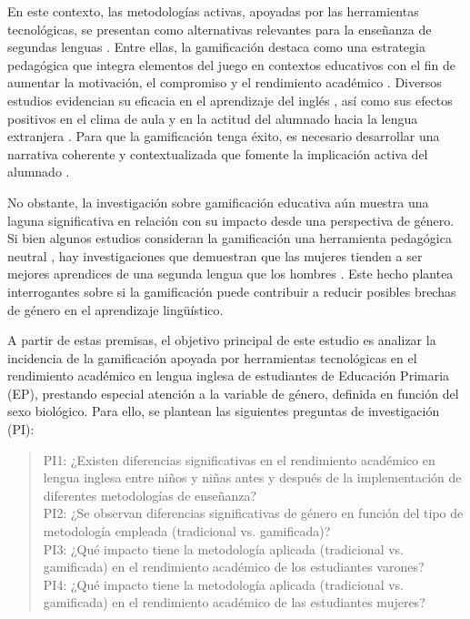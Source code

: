 \documentclass[spanish]{textolivre}
\begin{document}
En este contexto, las metodologías activas, apoyadas por las herramientas tecnológicas, se presentan como alternativas relevantes para la enseñanza de segundas lenguas \cite{silva2017, alvarez2021}. Entre ellas, la gamificación destaca como una estrategia pedagógica que integra elementos del juego en contextos educativos con el fin de aumentar la motivación, el compromiso y el rendimiento académico \cite{zambrano2020}. Diversos estudios evidencian su eficacia en el aprendizaje del inglés \cite{li2022, lampropoulos2022}, así como sus efectos positivos en el clima de aula y en la actitud del alumnado hacia la lengua extranjera \cite{sanchez2019, mora2020}. Para que la gamificación tenga éxito, es necesario desarrollar una narrativa coherente y contextualizada que fomente la implicación activa del alumnado \cite{quintero2018}.

No obstante, la investigación sobre gamificación educativa aún muestra una laguna significativa en relación con su impacto desde una perspectiva de género. Si bien algunos estudios consideran la gamificación una herramienta pedagógica neutral \cite{zahedi2021}, hay investigaciones que demuestran que las mujeres tienden a ser mejores aprendices de una segunda lengua que los hombres \cite{barrios2015, glowka2014}. Este hecho plantea interrogantes sobre si la gamificación puede contribuir a reducir posibles brechas de género en el aprendizaje lingüístico. 

A partir de estas premisas, el objetivo principal de este estudio es analizar la incidencia de la gamificación apoyada por herramientas tecnológicas en el rendimiento académico en lengua inglesa de estudiantes de Educación Primaria (EP), prestando especial atención a la variable de género, definida en función del sexo biológico. Para ello, se plantean las siguientes preguntas de investigación (PI):

\begin{quote}
    PI1: ¿Existen diferencias significativas en el rendimiento académico en lengua inglesa entre niños y niñas antes y después de la implementación de diferentes metodologías de enseñanza?
\\
    PI2: ¿Se observan diferencias significativas de género en función del tipo de metodología empleada (tradicional vs. gamificada)?
\\
PI3: ¿Qué impacto tiene la metodología aplicada (tradicional vs. gamificada) en el rendimiento académico de los estudiantes varones?
\\
PI4: ¿Qué impacto tiene la metodología aplicada (tradicional vs. gamificada) en el rendimiento académico de las estudiantes mujeres?
\end{quote}
\end{document}
